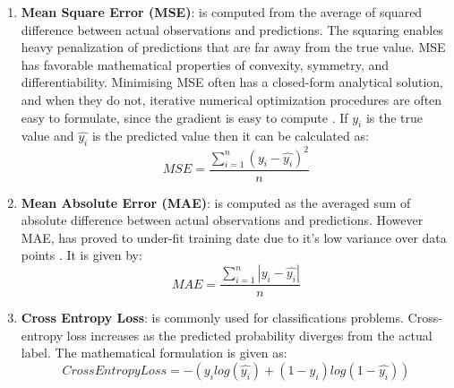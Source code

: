 \begin{enumerate}
\item	\textbf{Mean Square Error (MSE)}: is computed from the average of squared difference between actual observations and predictions. The squaring enables heavy penalization of predictions that are far away from the true value. MSE has favorable mathematical properties  of convexity, symmetry, and differentiability. Minimising MSE often has a closed-form analytical solution, and when they do not, iterative numerical optimization procedures are often easy to formulate, since the gradient is easy to compute \cite{4775883}. If $y_i$ is the true value and $\hat{y_i}$ is the predicted value then it can be calculated as: 
\begin{equation}
MSE = \frac{\sum_{i=1}^{n}\left(y_i - \hat{y_i}\right)^2}{n}
\end{equation}
\item	\textbf{Mean Absolute Error (MAE)}: is computed as the averaged sum of absolute difference between actual observations and predictions. However MAE, has proved to under-fit training date due to it's low variance over data points \cite{wang2020imae}. It is given by:
\begin{equation}
MAE = \frac{\sum_{i=1}^n|y_i - \hat{y_i}|}{n}
\end{equation}
\item \textbf{Cross Entropy Loss}: is commonly used for classifications problems. Cross-entropy loss increases as the predicted probability diverges from the actual label. The mathematical formulation is given as: 
\begin{equation}
Cross Entropy Loss = -(y_ilog(\hat{y_i}) + (1-y_i)log(1-\hat{y_i}))
\end{equation}
\end{enumerate}

